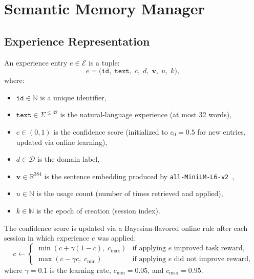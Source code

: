 \section{Semantic Memory Manager}

\label{sec:memory}

\subsection{Experience Representation}

\begin{definition}
\label{def:experience}
An experience entry $e \in \mathcal{E}$ is a tuple:
\begin{equation}
    e = \bigl(\texttt{id},\; \texttt{text},\; c,\; d,\; \bm{v},\; u,\; k\bigr),
    \label{eq:experience}
\end{equation}
where:
\begin{itemize}[leftmargin=1.5em]
    \item $\texttt{id} \in \mathbb{N}$ is a unique identifier,
    \item $\texttt{text} \in \Sigma^{\leq 32}$ is the natural-language experience
          (at most 32 words),
    \item $c \in (0, 1)$ is the confidence score (initialized to $c_0 = 0.5$
          for new entries, updated via online learning),
    \item $d \in \mathcal{D}$ is the domain label,
    \item $\bm{v} \in \mathbb{R}^{384}$ is the sentence embedding produced by
          \texttt{all-MiniLM-L6-v2}~\cite{reimers2019sentence},
    \item $u \in \mathbb{N}$ is the usage count (number of times retrieved and
          applied),
    \item $k \in \mathbb{N}$ is the epoch of creation (session index).
\end{itemize}
\end{definition}

The confidence score is updated via a Bayesian-flavored online rule after each
session in which experience $e$ was applied:
\begin{equation}
    c \leftarrow
    \begin{cases}
        \min(c + \gamma(1 - c),\; c_{\max}) & \text{if applying } e \text{ improved task reward,} \\
        \max(c - \gamma c,\; c_{\min}) & \text{if applying } e \text{ did not improve reward,}
    \end{cases}
    \label{eq:confidence-update}
\end{equation}
where $\gamma = 0.1$ is the learning rate, $c_{\min} = 0.05$, and
$c_{\max} = 0.95$.

